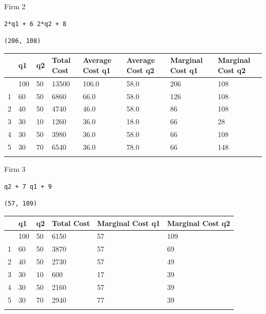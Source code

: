 \documentclass[
  ignorenonframetext,
]{beamer}
\begin{document}
\begin{frame}[fragile]{Firm 2}
\label{firm-2-1}
\begin{verbatim}
2*q1 + 6 2*q2 + 8
\end{verbatim}

\begin{verbatim}
(206, 108)
\end{verbatim}

\begin{longtable}[]{@{}llllllll@{}}
\toprule\noalign{}
& q1 & q2 & Total Cost & Average Cost q1 & Average Cost q2 & Marginal
Cost q1 & Marginal Cost q2 \\
\midrule\noalign{}
\endhead
0 & 100 & 50 & 13500 & 106.0 & 58.0 & 206 & 108 \\
1 & 60 & 50 & 6860 & 66.0 & 58.0 & 126 & 108 \\
2 & 40 & 50 & 4740 & 46.0 & 58.0 & 86 & 108 \\
3 & 30 & 10 & 1260 & 36.0 & 18.0 & 66 & 28 \\
4 & 30 & 50 & 3980 & 36.0 & 58.0 & 66 & 108 \\
5 & 30 & 70 & 6540 & 36.0 & 78.0 & 66 & 148 \\
\bottomrule\noalign{}
\end{longtable}
\end{frame}

\begin{frame}[fragile]{Firm 3}
\label{firm-3}
\begin{verbatim}
q2 + 7 q1 + 9
\end{verbatim}

\begin{verbatim}
(57, 109)
\end{verbatim}

\begin{longtable}[]{@{}llllll@{}}
\toprule\noalign{}
& q1 & q2 & Total Cost & Marginal Cost q1 & Marginal Cost q2 \\
\midrule\noalign{}
\endhead
0 & 100 & 50 & 6150 & 57 & 109 \\
1 & 60 & 50 & 3870 & 57 & 69 \\
2 & 40 & 50 & 2730 & 57 & 49 \\
3 & 30 & 10 & 600 & 17 & 39 \\
4 & 30 & 50 & 2160 & 57 & 39 \\
5 & 30 & 70 & 2940 & 77 & 39 \\
\bottomrule\noalign{}
\end{longtable}
\end{frame}
\end{document}
